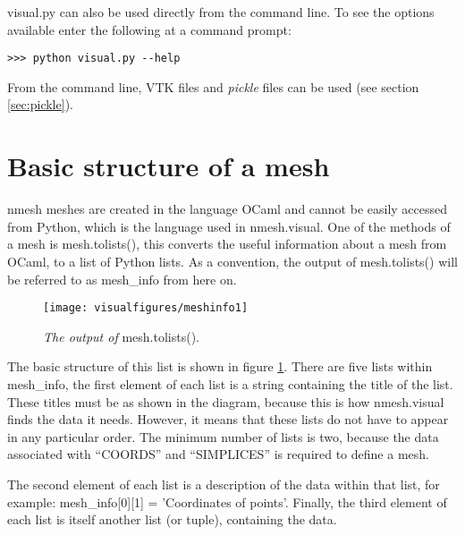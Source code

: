 {\ttfamily visual.py} can also be used directly from the command line. To see the options available enter the following at a command prompt:
\begin{lstlisting}
>>> python visual.py --help
\end{lstlisting}
From the command line, VTK files and {\em pickle} files can be used (see section \ref{sec:pickle}). 





\section{Basic structure of a mesh \label{sec:meshinf}}

{\ttfamily nmesh} meshes are created in the language OCaml and cannot be easily accessed from Python, which is the language used in {\ttfamily nmesh.visual}. One of the methods of a mesh is {\ttfamily mesh.tolists()}, this converts the useful information about a mesh from OCaml, to a list of Python lists. As a convention, the output of {\ttfamily mesh.tolists()} will be referred to as {\ttfamily mesh\_info} from here on.

\begin{figure}
\begin{center}
\texttt{[image: visualfigures/meshinfo1]}
\caption{{\em The output of} {\ttfamily mesh.tolists()}. \label{fig:meshinfo1}}
\end{center}
\end{figure}

The basic structure of this list is shown in figure \ref{fig:meshinfo1}. There are five lists within {\ttfamily mesh\_info}, the first element of each list is a string containing the title of the list. These titles must be as shown in the diagram, because this is how {\ttfamily nmesh.visual} finds the data it needs. However, it means that these lists do not have to appear in any particular order. The minimum number of lists is two, because the data associated with {\ttfamily ``COORDS''} and {\ttfamily ``SIMPLICES''} is required to define a mesh.

The second element of each list is a description of the data within that list, for example: {\ttfamily mesh\_info[0][1] = 'Coordinates of points'}. Finally, the third element of each list is itself another list (or tuple), containing the data. 

